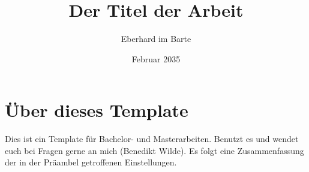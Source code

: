 

\title{Der Titel der Arbeit}
\author{Eberhard im Barte}
\date{Februar 2035}

%




\makedocumentstart

\chapter{Über dieses Template}
Dies ist ein Template für Bachelor- und Masterarbeiten.
Benutzt es und wendet euch bei Fragen gerne an mich (Benedikt Wilde).
Es folgt eine Zusammenfassung der in der Präambel getroffenen Einstellungen.

\let\pkg\textsf

